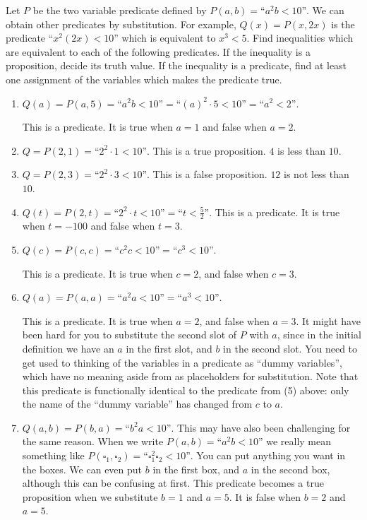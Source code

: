 \begin{solutions}
	Let $P$ be the two variable predicate defined by $P(a,b) = \textrm{``\(a^2b < 10\)''}$.  We can obtain other predicates by substitution.  For example, $Q(x) = P(x,2x)$ is the predicate $\textrm{``\(x^2(2x) < 10\)''}$ which is equivalent to $x^3 < 5$.  Find inequalities which are equivalent to each of the following predicates.  If the inequality is a proposition, decide its truth value.  If the inequality is a predicate, find at least one assignment of the variables which makes the predicate true.
	\begin{enumerate}
		\item $Q(a) = P(a,5) = \textrm{``\(a^2b < 10\)''} = \textrm{``\((a)^2\cdot 5 < 10\)''} = \textrm{``\(a^2 < 2\)''}  $.  
		
		This is a predicate.  It is true when $a = 1$ and false when $a=2$.
		
		\item $Q = P(2,1) = \textrm{``\(2^2\cdot 1 < 10\)''} $.  This is a true proposition.  $4$ is less than $10$.
		\item $Q = P(2,3)= \textrm{``\(2^2 \cdot 3 < 10\)''} $.  This is a false proposition.  $12$ is not less than $10$.
		\item $Q(t) = P(2,t) = \textrm{``\(2^2\cdot t < 10\)''} =  \textrm{``\(t < \frac{5}{2}\)''}  $.  This is a predicate.  It is true when $t = -100$ and false when $t = 3$.
		\item $Q(c) = P(c,c)= \textrm{``\(c^2c < 10\)''}  = \textrm{``\(c^3 < 10\)''}$. 
		
		This is a predicate.  It is true when $c = 2$, and false when $c = 3$. 
		\item $Q(a) = P(a,a)= \textrm{``\(a^2a < 10\)''}  = \textrm{``\(a^3 < 10\)''}$. 
		
		This is a predicate.  It is true when $a = 2$, and false when $a = 3$.  It might have been hard for you to substitute the second slot of $P$ with $a$, since in the initial definition we have an $a$ in the first slot, and $b$ in the second slot. You need to get used to thinking of the variables in a predicate as ``dummy variables'', which have no meaning aside from as placeholders for substitution.  Note that this predicate is functionally identical to the predicate from (5) above:  only the name of the ``dummy variable'' has changed from $c$ to $a$. 
		\item $Q(a,b) = P(b,a)  = \textrm{``\(b^2a < 10\)''}$. This may have also been challenging for the same reason.  When we write $P(a,b) = \textrm{``\(a^2b < 10\)''}$ we really mean something like $P(\square_1,\square_2) = \textrm{``\(\square_1^2\square_2 < 10\)''}$.  You can put anything you want in the boxes.  We can even put $b$ in the first box, and $a$ in the second box, although this can be confusing at first.  This predicate becomes a true proposition when we substitute $b = 1$ and $a = 5$.  It is false when $b = 2$ and $a = 5$.
	\end{enumerate}
\end{solutions}

